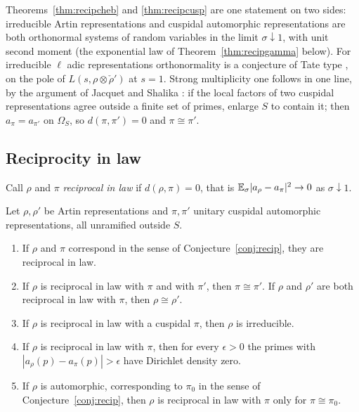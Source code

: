 Theorems~\ref{thm:recipcheb} and \ref{thm:recipcusp} are one statement on two sides: irreducible Artin representations and cuspidal automorphic representations are both orthonormal systems of random variables in the limit $\sigma\downarrow1$, with unit second moment (the exponential law of Theorem~\ref{thm:recipgamma} below). For irreducible $\ell$ adic representations orthonormality is a conjecture of Tate type \cite{tate1965}, on the pole of $L(s,\rho\otimes\check\rho')$ at $s=1$. Strong multiplicity one follows in one line, by the argument of Jacquet and Shalika \cite{jacquetshalika1981}: if the local factors of two cuspidal representations agree outside a finite set of primes, enlarge $S$ to contain it; then $a_\pi=a_{\pi'}$ on $\Omega_S$, so $d(\pi,\pi')=0$ and $\pi\cong\pi'$.

\subsection{Reciprocity in law}

Call $\rho$ and $\pi$ \emph{reciprocal in law} if $d(\rho,\pi)=0$, that is $\mathbb{E}_\sigma|a_\rho-a_\pi|^2\to0$ as $\sigma\downarrow1$.

\begin{corollary}\label{cor:reciplaw}
Let $\rho,\rho'$ be Artin representations and $\pi,\pi'$ unitary cuspidal automorphic representations, all unramified outside $S$.
\begin{enumerate}
\item[(i)] If $\rho$ and $\pi$ correspond in the sense of Conjecture~\ref{conj:recip}, they are reciprocal in law.
\item[(ii)] If $\rho$ is reciprocal in law with $\pi$ and with $\pi'$, then $\pi\cong\pi'$. If $\rho$ and $\rho'$ are both reciprocal in law with $\pi$, then $\rho\cong\rho'$.
\item[(iii)] If $\rho$ is reciprocal in law with a cuspidal $\pi$, then $\rho$ is irreducible.
\item[(iv)] If $\rho$ is reciprocal in law with $\pi$, then for every $\epsilon>0$ the primes with $|a_\rho(p)-a_\pi(p)|>\epsilon$ have Dirichlet density zero.
\item[(v)] If $\rho$ is automorphic, corresponding to $\pi_0$ in the sense of Conjecture~\ref{conj:recip}, then $\rho$ is reciprocal in law with $\pi$ only for $\pi\cong\pi_0$.
\end{enumerate}
\end{corollary}

